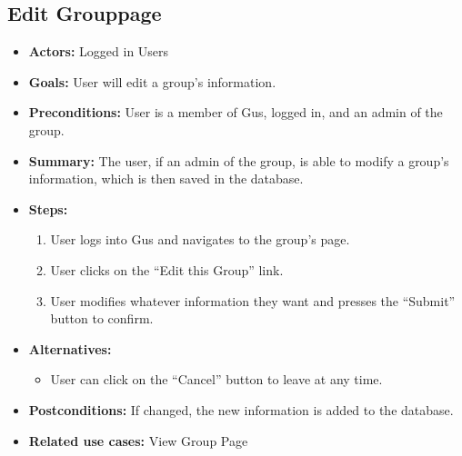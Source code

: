 \subsection{Edit Grouppage}
  \begin{itemize}
          \item{\textbf{Actors:} Logged in Users}
          \item{\textbf{Goals:} User will edit a group's information.}
          \item{\textbf{Preconditions:} User is a member of Gus, logged in, and an admin of the group.}
          \item{\textbf{Summary:} The user, if an admin of the group, is able to modify a group's information, which is then saved in the database.}
	  \item{\textbf{Steps:}}
	    \begin{enumerate}
	    \item{User logs into Gus and navigates to the group's page.}
	    \item{User clicks on the ``Edit this Group'' link.}
	    \item{User modifies whatever information they want and presses the ``Submit'' button to confirm.}
	    \end{enumerate}
	  \item{\textbf{Alternatives:}}
	  \begin{itemize}
	       \item{User can click on the ``Cancel'' button to leave at any time.}
	  \end{itemize}
	  \item{\textbf{Postconditions:} If changed, the new information is added to the database.}
	  \item{\textbf{Related use cases:} View Group Page }
     \end{itemize}
